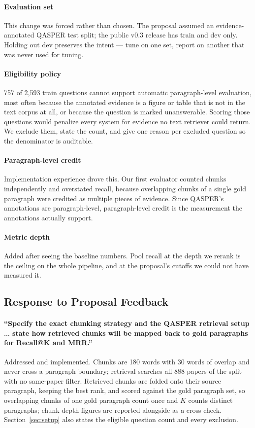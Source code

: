 \documentclass[sigconf,nonacm]{acmart}
\begin{document}
\paragraph{Evaluation set} This change was forced rather than chosen. The
proposal assumed an evidence-annotated QASPER test split; the public v0.3
release has train and dev only. Holding out dev preserves the intent --- tune on
one set, report on another that was never used for tuning.

\paragraph{Eligibility policy} 757 of 2{,}593 train questions cannot support
automatic paragraph-level evaluation, most often because the annotated evidence
is a figure or table that is not in the text corpus at all, or because the
question is marked unanswerable. Scoring those questions would penalize every
system for evidence no text retriever could return. We exclude them, state the
count, and give one reason per excluded question so the denominator is auditable.

\paragraph{Paragraph-level credit} Implementation experience drove this. Our
first evaluator counted chunks independently and overstated recall, because
overlapping chunks of a single gold paragraph were credited as multiple pieces
of evidence. Since QASPER's annotations are paragraph-level, paragraph-level
credit is the measurement the annotations actually support.

\paragraph{Metric depth} Added after seeing the baseline numbers. Pool recall at
the depth we rerank is the ceiling on the whole pipeline, and at the proposal's
cutoffs we could not have measured it.

\subsection{Response to Proposal Feedback}

\paragraph{``Specify the exact chunking strategy and the QASPER retrieval setup
$\ldots$ state how retrieved chunks will be mapped back to gold paragraphs for
Recall@K and MRR.''} Addressed and implemented. Chunks are 180 words with 30
words of overlap and never cross a paragraph boundary; retrieval searches all 888
papers of the split with no same-paper filter. Retrieved chunks are folded onto
their source paragraph, keeping the best rank, and scored against the gold
paragraph set, so overlapping chunks of one gold paragraph count once and $K$
counts distinct paragraphs; chunk-depth figures are reported alongside as a
cross-check. Section~\ref{sec:setup} also states the eligible question count and
every exclusion.
\end{document}
